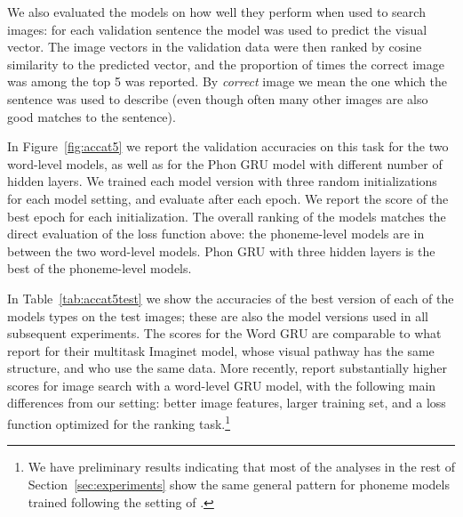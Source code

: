 We also evaluated the models on how well they perform when used to
search images: for each validation sentence the model was used to predict the
visual vector. The image vectors in the validation data were then
ranked by cosine similarity to the predicted vector, and the
proportion of times the correct image was among the top 5 was
reported. By {\it correct} image we mean the one which the sentence
was used to describe (even though often many other images are also
good matches to the sentence). 

In Figure~\ref{fig:accat5} we report the validation accuracies on this
task for the two word-level models, as well as for the Phon GRU
model with different number of hidden layers. We trained each model
version with three random initializations for each model setting, and
evaluate after each epoch. We report the score of the best epoch for
each initialization. 
The overall ranking of the models matches the direct
evaluation of the loss function above: the phoneme-level models are in
between the two word-level models. {\sc Phon GRU} with three
hidden layers is the best of the phoneme-level models.

In Table~\ref{tab:accat5test} we show the accuracies of the best
version of each of the models types on the test images; these are also
the model versions used in all subsequent experiments. The scores for 
the {\sc Word GRU} are comparable to what
 report for their multitask {\sc
  Imaginet} model, whose visual pathway has the same
structure, and who use the same data. 
More recently,  report substantially higher
scores for image search with a word-level GRU model, with the
following main differences from our setting: better image features,
larger training set, and a loss function optimized for the ranking
task.\footnote{We have preliminary results indicating that most of the
  analyses in the rest of Section~\ref{sec:experiments} show the same general
  pattern for phoneme models trained following the setting of
  .}

